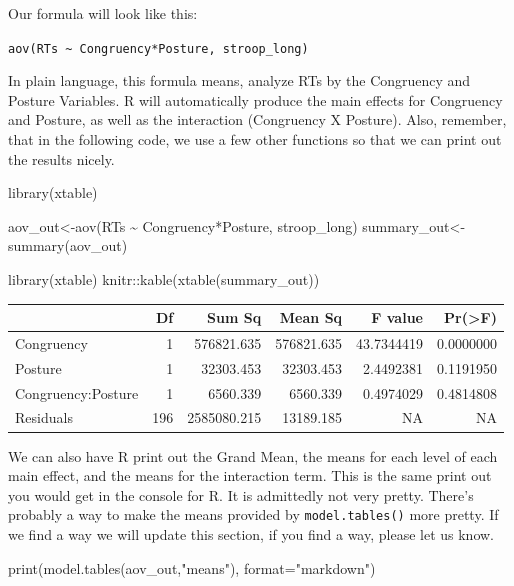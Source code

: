 \documentclass[
]{book}
\newenvironment{Shaded}{\begin{snugshade}}{\end{snugshade}}
\newcommand{\AttributeTok}[1]{\textcolor[rgb]{0.77,0.63,0.00}{#1}}
\newcommand{\FunctionTok}[1]{\textcolor[rgb]{0.00,0.00,0.00}{#1}}
\newcommand{\NormalTok}[1]{#1}
\newcommand{\OtherTok}[1]{\textcolor[rgb]{0.56,0.35,0.01}{#1}}
\newcommand{\SpecialCharTok}[1]{\textcolor[rgb]{0.00,0.00,0.00}{#1}}
\newcommand{\StringTok}[1]{\textcolor[rgb]{0.31,0.60,0.02}{#1}}
\begin{document}
Our formula will look like this:

\texttt{aov(RTs\ \textasciitilde{}\ Congruency*Posture,\ stroop\_long)}

In plain language, this formula means, analyze RTs by the Congruency and Posture Variables. R will automatically produce the main effects for Congruency and Posture, as well as the interaction (Congruency X Posture). Also, remember, that in the following code, we use a few other functions so that we can print out the results nicely.

\begin{Shaded}
\begin{Highlighting}[]
\FunctionTok{library}\NormalTok{(xtable)}

\NormalTok{aov\_out}\OtherTok{\textless{}{-}}\FunctionTok{aov}\NormalTok{(RTs }\SpecialCharTok{\textasciitilde{}}\NormalTok{ Congruency}\SpecialCharTok{*}\NormalTok{Posture, stroop\_long)}
\NormalTok{summary\_out}\OtherTok{\textless{}{-}}\FunctionTok{summary}\NormalTok{(aov\_out)}

\FunctionTok{library}\NormalTok{(xtable)}
\NormalTok{knitr}\SpecialCharTok{::}\FunctionTok{kable}\NormalTok{(}\FunctionTok{xtable}\NormalTok{(summary\_out))}
\end{Highlighting}
\end{Shaded}

\begin{tabular}{l|r|r|r|r|r}
\hline
  & Df & Sum Sq & Mean Sq & F value & Pr(>F)\\
\hline
Congruency & 1 & 576821.635 & 576821.635 & 43.7344419 & 0.0000000\\
\hline
Posture & 1 & 32303.453 & 32303.453 & 2.4492381 & 0.1191950\\
\hline
Congruency:Posture & 1 & 6560.339 & 6560.339 & 0.4974029 & 0.4814808\\
\hline
Residuals & 196 & 2585080.215 & 13189.185 & NA & NA\\
\hline
\end{tabular}

We can also have R print out the Grand Mean, the means for each level of each main effect, and the means for the interaction term. This is the same print out you would get in the console for R. It is admittedly not very pretty. There's probably a way to make the means provided by \texttt{model.tables()} more pretty. If we find a way we will update this section, if you find a way, please let us know.

\begin{Shaded}
\begin{Highlighting}[]
\FunctionTok{print}\NormalTok{(}\FunctionTok{model.tables}\NormalTok{(aov\_out,}\StringTok{"means"}\NormalTok{), }\AttributeTok{format=}\StringTok{"markdown"}\NormalTok{)}
\end{Highlighting}
\end{Shaded}
\end{document}
